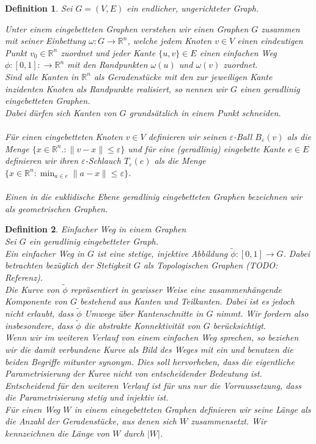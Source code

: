 \documentclass[a4paper, 12pt, twoside]{article}
\theoremstyle{Format1} %
\newtheorem{Def}{Definition}[section]       %
\begin{document}
\begin{Def}
	Sei $G=(V,E)$ ein endlicher, ungerichteter Graph.

	Unter einem \textit{eingebetteten Graphen} verstehen wir einen Graphen $G$
	zusammen mit seiner \textit{Einbettung} $\omega: G \to \mathbb{R}^n$, welche
	jedem Knoten $v \in V$ einen eindeutigen Punkt $v_0 \in \mathbb{R}^n$ zuordnet und jeder Kante $\{u,v\} \in E$
	einen einfachen Weg $\phi: [0,1]: \to \mathbb{R}^n$ mit den Randpunkten $\omega(u)$ und $\omega(v)$ zuordnet.
	\\
	Sind alle Kanten in $\mathbb{R}^n$ als Geradenstücke mit den zur jeweiligen Kante inzidenten Knoten als Randpunkte realisiert, so
	nennen wir $G$ einen \textit{geradlinig eingebetteten Graphen}.
	\\
	Dabei dürfen sich Kanten von $G$ grundsätzlich in einem Punkt schneiden.
	\\
	\\
	Für einen eingebetteten Knoten $v \in V$ definieren wir seinen \textit{$\varepsilon$-Ball} $B_{\varepsilon}(v)$ als die Menge
	$\{x \in \mathbb{R}^n.: \|v-x\| \leq \varepsilon\}$
	und für eine (geradlinig) eingebette Kante $e \in E$ definieren wir ihren \textit{$\varepsilon$-Schlauch} $T_{\varepsilon}(e)$ als die Menge
	$\{x \in \mathbb{R}^n: \min_{a \in e}\|a-x\| \leq \varepsilon\}$.
	\\
	\\
	Einen in die euklidische Ebene geradlinig eingebetteten Graphen bezeichnen wir als \textit{geometrischen Graphen}.
\end{Def}

\begin{Def}
	Einfacher Weg in einem Graphen
	\\
	Sei $G$ ein geradlinig eingebetteter Graph.
	\\
	Ein einfacher Weg in $G$ ist eine stetige, injektive Abbildung $\tilde{\phi}: [0,1] \to G$.
	Dabei betrachten bezüglich der Stetigkeit $G$ als Topologischen Graphen (TODO: Referenz).
	\\
	Die Kurve von $\tilde{\phi}$ repräsentiert in gewisser Weise eine zusammenhängende Komponente von $G$ bestehend aus
	Kanten und Teilkanten. Dabei ist es jedoch nicht erlaubt, dass $\tilde{\phi}$ Umwege über Kantenschnitte in $G$ nimmt.
	Wir fordern also insbesondere, dass $\tilde{\phi}$ die abstrakte Konnektivität von $G$ berücksichtigt.
	\\
	Wenn wir im weiteren Verlauf von einem einfachen Weg sprechen, so beziehen wir die damit verbundene Kurve als Bild des Weges
	mit ein und benutzen die beiden Begriffe mitunter synonym. Dies soll hervorheben, dass die eigentliche Parametrisierung
	der Kurve nicht von entscheidender Bedeutung ist. Entscheidend für den weiteren Verlauf ist für uns nur die Vorraussetzung, dass die
	Parametrisierung stetig und injektiv ist.
	\\
	Für einen Weg $W$ in einem einegebetteten Graphen definieren wir seine \textit{Länge} als die Anzahl der Geradenstücke, aus
	denen sich $W$ zusammensetzt. Wir kennzeichnen die Länge von $W$ durch $|W|$.
\end{Def}
\end{document}
